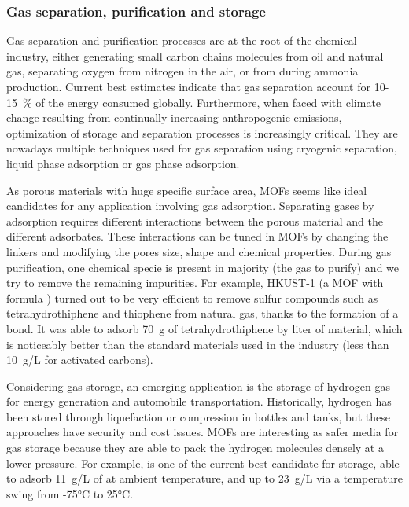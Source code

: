 \documentclass[thesis]{subfiles}
\begin{document}
\subsubsection{Gas separation, purification and storage}

Gas separation and purification processes are at the root of the chemical
industry, either generating small carbon chains molecules from oil and natural
gas, separating oxygen from nitrogen in the air, or  from  during
ammonia production. Current best estimates indicate that gas separation account
for 10-15~\% of the energy consumed globally. Furthermore, when faced with
climate change resulting from continually-increasing anthropogenic 
emissions, optimization of storage and separation processes is increasingly
critical. They are nowadays multiple techniques used for gas separation using
cryogenic separation, liquid phase adsorption or gas phase adsorption.

As porous materials with huge specific surface area, MOFs seems like ideal
candidates for any application involving gas adsorption. Separating gases by
adsorption requires different interactions between the porous material and the
different adsorbates. These interactions can be tuned in MOFs by changing the
linkers and modifying the pores size, shape and chemical properties. During gas
purification, one chemical specie is present in majority (the gas to purify) and
we try to remove the remaining impurities. For example, HKUST-1 (a MOF with
formula ) turned out to be very efficient to remove sulfur
compounds such as tetrahydrothiphene and thiophene from natural gas, thanks to
the formation of a  bond\cite{Mueller2006}. It was able to adsorb
\SI{70}{g} of tetrahydrothiphene by liter of material, which is noticeably
better than the standard materials used in the industry (less than \SI{10}{g/L}
for activated carbons).

Considering gas storage, an emerging application is the storage of hydrogen gas
for energy generation and automobile transportation. Historically, hydrogen has
been stored through liquefaction or compression in bottles and tanks, but these
approaches have security and cost issues. MOFs are interesting as safer media
for gas storage because they are able to pack the hydrogen molecules densely at
a lower pressure. For example,  is one of the current
best candidate for  storage, able to adsorb \SI{11}{g/L} of  at
ambient temperature, and up to \SI{23}{g/L} via a temperature swing from -75°C
to 25°C\cite{Kapelewski2018}.
\end{document}
